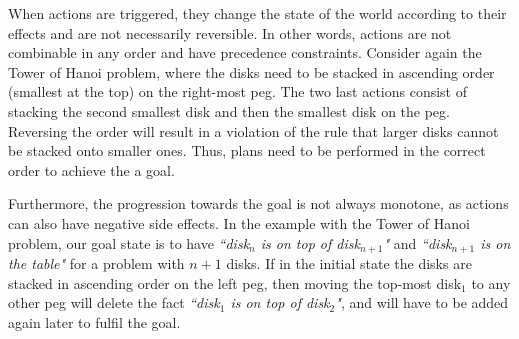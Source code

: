 


When actions are triggered, they change the state of the world according to their effects and are not necessarily reversible. 
In other words, actions are not combinable in any order and have precedence constraints. 
Consider again the Tower of Hanoi problem, where the disks need to be stacked in ascending order (smallest at the top) on the right-most peg. 
The two last actions consist of stacking the second smallest disk and then the smallest disk on the peg. 
Reversing the order will result in a violation of the rule that larger disks cannot be stacked onto smaller ones. Thus, plans need to be performed in the correct order to achieve the a goal.

Furthermore, the progression towards the goal is not always monotone, as actions can also have negative side effects. 
In the example with the Tower of Hanoi problem, our goal state is to have \textit{``disk$_{n}$ is on top of disk$_{n+1}$"} and \textit{``disk$_{n+1}$ is on the table"} for a problem with $n+1$ disks. 
If in the initial state the disks are stacked in ascending order on the left peg, then moving the top-most disk$_1$ to any other peg will delete the fact \textit{``disk$_1$ is on top of disk$_2$"}, and will have to be added again later to fulfil the goal. %




